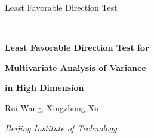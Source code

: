 \documentclass[12pt]{article} %
\theoremstyle{definition}
\begin{document}

\renewcommand{\baselinestretch}{2}


{\hfill {\footnotesize\rm Least Favorable Direction Test} \hfill}

\renewcommand{\thefootnote}{}
$\ $\par


\fontsize{12}{14pt plus.8pt minus .6pt}\selectfont \vspace{0.8pc}
\centerline{\large\bf Least Favorable Direction Test for }
\vspace{2pt} \centerline{\large\bf Multivariate Analysis of Variance}
\vspace{2pt} \centerline{\large\bf in High Dimension}
\vspace{.4cm} \centerline{
    Rui Wang, Xingzhong Xu
} \vspace{.4cm} \centerline{\it
Beijing Institute of Technology
}
 \vspace{.55cm} \fontsize{9}{11.5pt plus.8pt minus
.6pt}\selectfont

\end{document}
